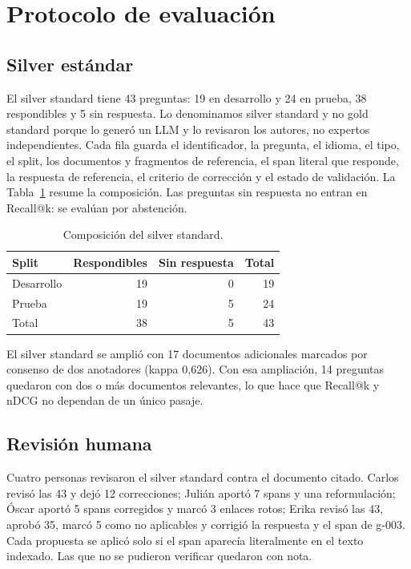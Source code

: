 \section{Protocolo de evaluaci\'on}
\label{sec:evaluacion}

\subsection{Silver est\'andar}

El silver standard tiene 43 preguntas: 19 en desarrollo y 24 en prueba, 38 respondibles y 5 sin respuesta. Lo denominamos silver standard y no gold standard porque lo gener\'o un LLM y lo revisaron los autores, no expertos independientes. Cada fila guarda el identificador, la pregunta, el idioma, el tipo, el split, los documentos y fragmentos de referencia, el span literal que responde, la respuesta de referencia, el criterio de correcci\'on y el estado de validaci\'on. La Tabla~\ref{tab:silver} resume la composici\'on. Las preguntas sin respuesta no entran en Recall@k: se eval\'uan por abstenci\'on.

\begin{table}[t]
\centering
\caption{Composici\'on del silver standard.}
\label{tab:silver}
\begin{tabular}{lrrr}
\toprule
Split & Respondibles & Sin respuesta & Total \\
\midrule
Desarrollo & 19 & 0 & 19 \\
Prueba & 19 & 5 & 24 \\
\midrule
Total & 38 & 5 & 43 \\
\bottomrule
\end{tabular}
\end{table}

El silver standard se ampli\'o con 17 documentos adicionales marcados por consenso de dos anotadores (kappa 0,626). Con esa ampliaci\'on, 14 preguntas quedaron con dos o m\'as documentos relevantes, lo que hace que Recall@k y nDCG no dependan de un \'unico pasaje.

\subsection{Revisi\'on humana}

Cuatro personas revisaron el silver standard contra el documento citado. Carlos revis\'o las 43 y dej\'o 12 correcciones; Juli\'an aport\'o 7 spans y una reformulaci\'on; \'Oscar aport\'o 5 spans corregidos y marc\'o 3 enlaces rotos; Erika revis\'o las 43, aprob\'o 35, marc\'o 5 como no aplicables y corrigi\'o la respuesta y el span de g-003. Cada propuesta se aplic\'o solo si el span aparec\'ia literalmente en el texto indexado. Las que no se pudieron verificar quedaron con nota.

